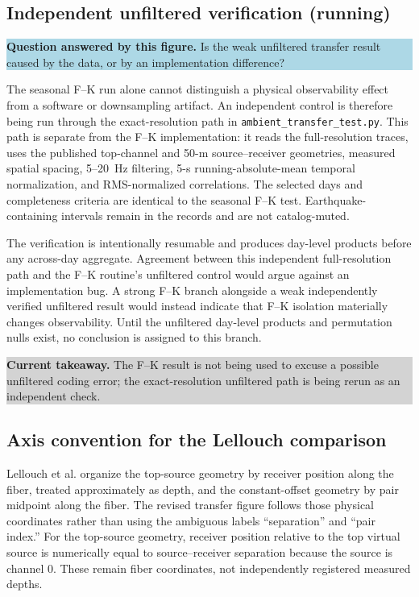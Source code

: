 \documentclass[11pt]{article}
\newcommand{\code}[1]{\texttt{#1}}
\newcommand{\figquestion}[1]{\par\medskip\noindent\colorbox{lightblue}{\parbox{0.95\linewidth}{\textcolor{questionblue}{\textbf{Question answered by this figure.}} #1}}\par\medskip}
\newcommand{\takeaway}[1]{\par\smallskip\noindent\colorbox{lightgray}{\parbox{0.95\linewidth}{\textbf{Current takeaway.} #1}}\par\medskip}
\begin{document}
\subsection{Independent unfiltered verification (running)}
\figquestion{Is the weak unfiltered transfer result caused by the data, or by an implementation difference?}

The seasonal F--K run alone cannot distinguish a physical observability effect from a software or downsampling artifact. An independent control is therefore being run through the exact-resolution path in \code{ambient\_transfer\_test.py}. This path is separate from the F--K implementation: it reads the full-resolution traces, uses the published top-channel and 50-m source--receiver geometries, measured spatial spacing, 5--20~Hz filtering, 5-s running-absolute-mean temporal normalization, and RMS-normalized correlations. The selected days and completeness criteria are identical to the seasonal F--K test. Earthquake-containing intervals remain in the records and are not catalog-muted.

The verification is intentionally resumable and produces day-level products before any across-day aggregate. Agreement between this independent full-resolution path and the F--K routine's unfiltered control would argue against an implementation bug. A strong F--K branch alongside a weak independently verified unfiltered result would instead indicate that F--K isolation materially changes observability. Until the unfiltered day-level products and permutation nulls exist, no conclusion is assigned to this branch.

\takeaway{The F--K result is not being used to excuse a possible unfiltered coding error; the exact-resolution unfiltered path is being rerun as an independent check.}


\subsection{Axis convention for the Lellouch comparison}
Lellouch et al. organize the top-source geometry by receiver position along the fiber, treated approximately as depth, and the constant-offset geometry by pair midpoint along the fiber. The revised transfer figure follows those physical coordinates rather than using the ambiguous labels ``separation'' and ``pair index.'' For the top-source geometry, receiver position relative to the top virtual source is numerically equal to source--receiver separation because the source is channel 0. These remain fiber coordinates, not independently registered measured depths.
\end{document}

